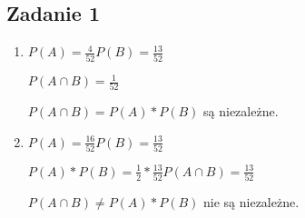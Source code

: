 \subsection{Zadanie 1}

\begin{enumerate}[label=(\alph*)]
\item
$P(A) = \frac{4}{52}  P(B) = \frac{13}{52}$

$P(A \cap B) = \frac{1}{52}$

$P(A \cap B) = P(A) * P(B)$ są niezależne.

\item
$P(A) = \frac{16}{52}  P(B) = \frac{13}{52}$

$P(A) * P(B) = \frac{1}{2} * \frac{13}{52}  P(A \cap B) = \frac{13}{52}$

$P(A \cap B) \neq P(A) * P(B)$ nie są niezależne.
\end{enumerate}

